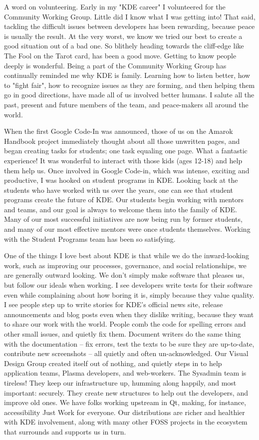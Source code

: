 A word on volunteering. Early in my "KDE career" I volunteered for the Community Working Group. Little did I know what I was getting into! That said, tackling the difficult issues between developers has been rewarding, because peace is usually the result. At the very worst, we know we tried our best to create a good situation out of a bad one. So blithely heading towards the cliff-edge like The Fool on the Tarot card, has been a good move. Getting to know people deeply is wonderful. Being a part of the Community Working Group has continually reminded me why KDE is family. Learning how to listen better, how to "fight fair", how to recognize issues as they are forming, and then helping them go in good directions, have made all of us involved better humans. I salute all the past, present and future members of the team, and peace-makers all around the world.

When the first Google Code-In was announced, those of us on the Amarok Handbook project immediately thought about all those unwritten pages, and began creating tasks for students; one task equaling one page. What a fantastic experience! It was wonderful to interact with those kids (ages 12-18) and help them help us. Once involved in Google Code-in, which was intense, exciting and productive, I was hooked on student programs in KDE. Looking back at the students who have worked with us over the years, one can see that student programs create the future of KDE. Our students begin working with mentors and teams, and our goal is always to welcome them into the family of KDE. Many of our most successful initiatives are now being run by former students, and many of our most effective mentors were once students themselves. Working with the Student Programs team has been so satisfying.

One of the things I love best about KDE is that while we do the inward-looking work, such as improving our processes, governance, and social relationships, we are generally outward looking. We don't simply make software that pleases us, but follow our ideals when working. I see developers write tests for their software even while complaining about how boring it is, simply because they value quality. I see people step up to write stories for KDE's official news site, release announcements and blog posts even when they dislike writing, because they want to share our work with the world. People comb the code for spelling errors and other small issues, and quietly fix them. Document writers do the same thing with the documentation -- fix errors, test the texts to be sure they are up-to-date, contribute new screenshots -- all quietly and often un-acknowledged. Our Visual Design Group created itself out of nothing, and quietly steps in to help application teams, Plasma developers, and web-workers. The Sysadmin team is tireless! They keep our infrastructure up, humming along happily, and most important: securely. They create new structures to help out the developers, and improve old ones. We have folks working upstream in Qt, making, for instance, accessibility Just Work for everyone. Our distributions are richer and healthier with KDE involvement, along with many other FOSS projects in the ecosystem that surrounds and supports us in turn.

